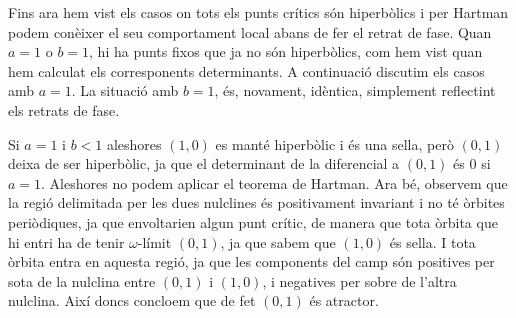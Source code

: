 \documentclass[12pt]{article}
\numberwithin{table}{section}
\numberwithin{equation}{section}
\numberwithin{figure}{section}
\begin{document}
Fins ara hem vist els casos on tots els punts crítics són hiperbòlics i per Hartman podem conèixer el seu comportament local abans de fer el retrat de fase. Quan \( a = 1 \) o \( b = 1 \), hi ha punts fixos que ja no són hiperbòlics, com hem vist quan hem calculat els corresponents determinants. A continuació discutim els casos amb \( a = 1 \). La situació amb \( b = 1 \), és, novament, idèntica, simplement reflectint els retrats de fase. 

Si \( a = 1 \) i \( b < 1 \) aleshores \( (1,0) \) es manté hiperbòlic i és una sella, però \( (0,1) \) deixa de ser hiperbòlic, ja que el determinant de la diferencial a \( (0,1) \) és 0 si \( a = 1 \). Aleshores no podem aplicar el teorema de Hartman. Ara bé, observem que la regió delimitada per les dues nulclines és positivament invariant i no té òrbites periòdiques, ja que envoltarien algun punt crític, de manera que tota òrbita que hi entri ha de tenir \( \omega \)-límit \( (0,1) \), ja que sabem que \( (1,0) \) és sella. I tota òrbita entra en aquesta regió, ja que les components del camp són positives per sota de la nulclina entre \( (0,1) \) i \( (1,0) \), i negatives per sobre de l'altra nulclina. Així doncs concloem que de fet \( (0,1) \) és atractor. 
\end{document}
